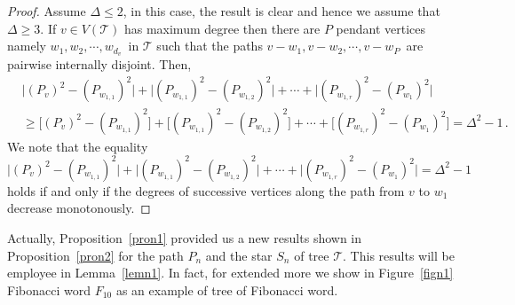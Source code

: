 \documentclass[12pt, a4paper]{article}
\begin{document}
\begin{proof}
Assume $\Delta\le2$, in this case, the result is clear and hence we assume that $\Delta\ge3$. If $v\in V(\mathscr{T})$ has maximum degree then there are $P$ pendant vertices namely $w_1,w_2,\cdots,w_{d_v}\,$ in $\mathscr{T}$ such that the paths $v-w_1,v-w_2,\cdots,v-w_{P}\,$ are pairwise internally disjoint.  Then,
\begin{align*}
&\big|(P_v)^2-(P_{w_{1,1}})^2\big| + \big|(P_{w_{1,1}})^2-(P_{w_{1,2}})^2\big| +\cdots + \big|(P_{w_{1,r}})^2 - (P_{w_{1}})^2\big|\\
&\ge \big[(P_v)^2-(P_{w_{1,1}})^2\big] + \big[(P_{w_{1,1}})^2-(P_{w_{1,2}})^2\big] +\cdots + \big[(P_{w_{1,r}})^2 - (P_{w_{1}})^2\big]=\Delta^2 -1\,.
\end{align*}
We note that the equality
\[
\big|(P_v)^2-(P_{w_{1,1}})^2\big| + \big|(P_{w_{1,1}})^2-(P_{w_{1,2}})^2\big| +\cdots + \big|(P_{w_{1,r}})^2 - (P_{w_{1}})^2\big| = \Delta^2 -1
\]
holds if and only if the degrees of successive vertices along the path from $v$ to $w_1$ decrease monotonously.
\end{proof}
Actually, Proposition~\ref{pron1} provided us a new results shown in Proposition~\ref{pron2} for the path $P_n$ and the star $S_n$ of tree $\mathscr{T}$. This results will be employee in Lemma~\ref{lemn1}. In fact, for extended more we show in Figure~\ref{fign1} Fibonacci word $F_{10}$ as an example of tree of Fibonacci word.
\end{document}
